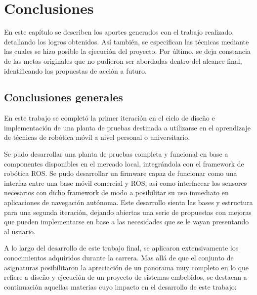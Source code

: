 
\chapter{Conclusiones}

En este capítulo se describen los aportes generados con el trabajo realizado, detallando los logros obtenidos. Así también, se especifican las técnicas mediante las cuales se hizo posible la ejecución del proyecto. Por último, se deja constancia de las metas originales que no pudieron ser abordadas dentro del alcance final, identificando las propuestas de acción a futuro.

\label{Chapter5}

\section{Conclusiones generales}

En este trabajo se completó la primer iteración en el ciclo de diseño e implementación de una planta de pruebas destinada a utilizarse en el aprendizaje de técnicas de robótica móvil a nivel personal o universitario.

Se pudo desarrollar una planta de pruebas completa y funcional en base a componentes disponibles en el mercado local, integrándola con el framework de robótica ROS. Se pudo desarrollar un firmware capaz de funcionar como una interfaz entre una base móvil comercial y ROS, así como interfacear los sensores necesarios con dicho framework de modo a posibilitar su uso inmediato en aplicaciones de navegación autónoma. Este desarrollo sienta las bases y estructura para una segunda iteración, dejando abiertas una serie de propuestas con mejoras que pueden implementarse en base a las necesidades que se le vayan presentando al usuario.

A lo largo del desarrollo de este trabajo final, se aplicaron extensivamente los conocimientos adquiridos durante la carrera. Mas allá de que el conjunto de asignaturas posibilitaron la apreciación de un panorama muy completo en lo que refiere a diseño y ejecución de un proyecto de sistemas embebidos, se destacan a continuación aquellas materias cuyo impacto en el desarrollo de este trabajo:


